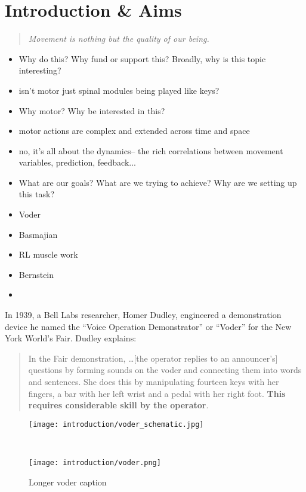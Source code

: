 \documentclass[../main.tex]{subfiles}
\begin{document}
\chapter{Introduction \& Aims}\label{chap:intro}

\bigskip
\begin{quote}
  \emph{Movement is nothing but the quality of our being.}
  
\end{quote}

\cleardoublepage%


\begin{itemize}
  \item Why do this? Why fund or support this? Broadly, why is this topic interesting?
  \item isn't motor just spinal modules being played like keys?
  \item Why motor? Why be interested in this?
  \item motor actions are complex and extended across time and space
  \item no, it's all about the dynamics-- the rich correlations between movement variables, prediction, feedback...
  \item What are our goals? What are we trying to achieve? Why are we setting up this task? 
  \item Voder
  \item Basmajian
  \item RL muscle work
  \item Bernstein
  \item 
\end{itemize}


In 1939, a Bell Labs researcher, Homer Dudley, engineered a demonstration device he named the ``Voice Operation Demonstrator'' or ``Voder'' for the New York World's Fair\cite{Dudley}. Dudley explains:

\begin{quote}
  In the Fair demonstration, \ldots [the operator replies to an announcer's] questions by forming sounds on the voder and connecting them into words and sentences. She does this by manipulating fourteen keys with her fingers, a bar with her left wrist and a pedal with her right foot. \textbf{This requires considerable skill by the operator}.
\end{quote}


\begin{figure}
  \centering
  \begin{minipage}{0.8\textwidth}
    \texttt{[image: introduction/voder\_schematic.jpg]}
    \subcaption{}
  \end{minipage}\\%
  \begin{minipage}{0.5\textwidth}
    \texttt{[image: introduction/voder.png]}
    \subcaption{}
  \end{minipage}
  \caption[Voder]{Longer voder caption}\label{fig:voder}
\end{figure}
\end{document}
